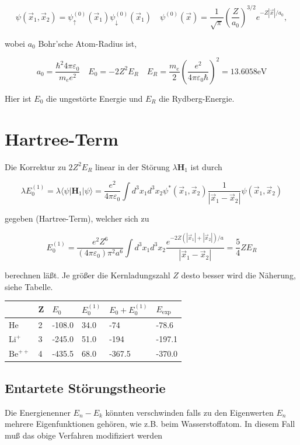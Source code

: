 \documentclass[10pt, letterpaper]{article}
\begin{document}
$$
\psi\left(\vec{x}_{1}, \vec{x}_{2}\right)=\psi_{\uparrow}^{(0)}\left(\vec{x}_{1}\right) \psi_{\downarrow}^{(0)}\left(\vec{x}_{1}\right) \quad \psi^{(0)}(\vec{x})=\frac{1}{\sqrt{\pi}}\left(\frac{Z}{a_{0}}\right)^{3 / 2} e^{-Z|\vec{x}| / a_{0}},
$$

wobei $a_{0}$ Bohr'sche Atom-Radius ist,

$$
a_{0}=\frac{\hbar^{2} 4 \pi \varepsilon_{0}}{m_{e} e^{2}} \quad E_{0}=-2 Z^{2} E_{R} \quad E_{R}=\frac{m_{e}}{2}\left(\frac{e^{2}}{4 \pi \varepsilon_{0} \hbar}\right)^{2}=13.6058 \mathrm{eV}
$$

Hier ist $E_{0}$ die ungestörte Energie und $E_{R}$ die Rydberg-Energie.

\section*{Hartree-Term}
Die Korrektur zu $2 Z^{2} E_{R}$ linear in der Störung $\lambda \mathbf{H}_{1}$ ist durch

$$
\lambda E_{0}^{(1)}=\lambda\langle\psi| \mathbf{H}_{1}|\psi\rangle=\frac{e^{2}}{4 \pi \varepsilon_{0}} \int d^{3} x_{1} d^{3} x_{2} \psi^{*}\left(\vec{x}_{1}, \vec{x}_{2}\right) \frac{1}{\left|\vec{x}_{1}-\vec{x}_{2}\right|} \psi\left(\vec{x}_{1}, \vec{x}_{2}\right)
$$

gegeben (Hartree-Term), welcher sich zu

$$
E_{0}^{(1)}=\frac{e^{2} Z^{6}}{\left(4 \pi \varepsilon_{0}\right) \pi^{2} a^{6}} \int d^{3} x_{1} d^{3} x_{2} \frac{e^{-2 Z\left(\left|\vec{x}_{1}\right|+\left|\vec{x}_{2}\right|\right) / a}}{\left|\vec{x}_{1}-\vec{x}_{2}\right|}=\frac{5}{4} Z E_{R}
$$

berechnen läßt. Je größer die Kernladungszahl $Z$ desto besser wird die Näherung, siehe Tabelle.

\begin{center}
\begin{tabular}{|l|l|l|l|l|l|}
\hline
 & Z & $E_{0}$ & $E_{0}^{(1)}$ & $E_{0}+E_{0}^{(1)}$ & $E_{\text {exp }}$ \\
\hline
He & 2 & -108.0 & 34.0 & -74 & -78.6 \\
$\mathrm{Li}^{+}$ & 3 & -245.0 & 51.0 & -194 & -197.1 \\
$\mathrm{Be}^{++}$ & 4 & -435.5 & 68.0 & -367.5 & -370.0 \\
\hline
\end{tabular}
\end{center}

\subsection*{Entartete Störungstheorie}
Die Energienenner $E_{n}-E_{k}$ könnten verschwinden falls zu den Eigenwerten $E_{n}$ mehrere Eigenfunktionen gehören, wie z.B. beim Wasserstoffatom. In diesem Fall muß das obige Verfahren modifiziert werden
\end{document}
